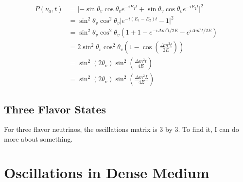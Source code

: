 \documentclass{tufte-handout}
\begin{document}
\begin{itemize}
    \begin{align*}
    P(\nu_a,t) & = \lvert -\sin\theta_v \cos\theta_v e^{-iE_1t} + \sin\theta_v \cos\theta_v e^{-iE_2t}  \rvert^2 \\
    & = \sin^2\theta_v \cos^2\theta_v \lvert e^{-i(E_1 - E_2)t} - 1 \rvert^2 \\
    & = \sin^2\theta_v \cos^2\theta_v \left(  1 +1 - e^{-i \Delta m^2 t/2E} -  e^{i \Delta m^2 t/2E}  \right) \\
    & = 2 \sin^2\theta_v \cos^2\theta_v \left( 1- \cos\left( \frac{\Delta m^2 t}{2E} \right) \right) \\
    & = \sin^2 ( 2\theta_v ) \sin^2\left( \frac{\Delta m^2 t}{4E}  \right) \\
    &  = \sin^2 ( 2\theta_v ) \sin^2\left( \frac{\Delta m^2 L}{4E}  \right)
    \end{align*}
    
\end{itemize}






\subsection{Three Flavor States}

For three flavor neutrinos, the oscillations matrix is 3 by 3. To find it, I can do more about something.




\section{Oscillations in Dense Medium}
\end{document}
